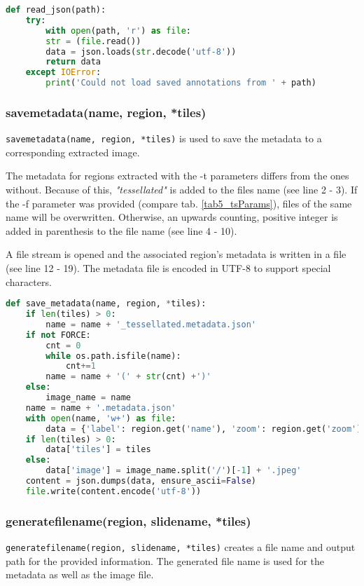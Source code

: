 \begin{lstlisting}[frame=single,language=python]
def read_json(path):
	try:
		with open(path, 'r') as file:
		str = (file.read())
		data = json.loads(str.decode('utf-8'))
		return data
	except IOError:
		print('Could not load saved annotations from ' + path)
\end{lstlisting}


\subsubsection{save{\textunderscore}metadata(name, region, *tiles)}

\texttt{save{\textunderscore}metadata(name, region, *tiles)} is used to save the metadata to a corresponding extracted image.

The metadata for regions extracted with the -t parameters differs from the ones without. Because of this, \emph{"{\textunderscore}tessellated"} is added to the files name (see line 2 - 3). If the -f parameter was provided (compare tab. \ref{tab5_tsParams}), files of the same name will be overwritten. Otherwise, an upwards counting, positive integer is added in parenthesis to the file name (see line 4 - 10).

A file stream is opened and the associated region's metadata is written in a file (see line 12 - 19). The metadata file is encoded in UTF-8 to support special characters.

\begin{lstlisting}[frame=single,language=python]
def save_metadata(name, region, *tiles):
	if len(tiles) > 0:
		name = name + '_tessellated.metadata.json'
	if not FORCE:
		cnt = 0
		while os.path.isfile(name):
			cnt+=1
		name = name + '(' + str(cnt) +')'
	else:
		image_name = name
	name = name + '.metadata.json'
	with open(name, 'w+') as file:
		data = {'label': region.get('name'), 'zoom': region.get('zoom'), 'context': region.get('context')}
	if len(tiles) > 0:
		data['tiles'] = tiles
	else:
		data['image'] = image_name.split('/')[-1] + '.jpeg'
	content = json.dumps(data, ensure_ascii=False)
	file.write(content.encode('utf-8'))
\end{lstlisting}


\subsubsection{generate{\textunderscore}file{\textunderscore}name(region, slide{\textunderscore}name, *tiles)}
\texttt{generate{\textunderscore}file{\textunderscore}name(region, slide{\textunderscore}name, *tiles)} creates a file name and output path for the provided information. The generated file name is used for the metadata as well as the image file.


